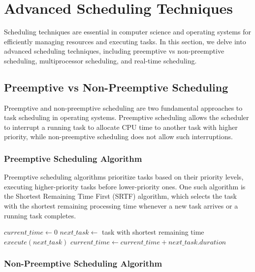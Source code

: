 \documentclass[12pt]{book} %
\begin{document}
\section{Advanced Scheduling Techniques}

Scheduling techniques are essential in computer science and operating systems for efficiently managing resources and executing tasks. In this section, we delve into advanced scheduling techniques, including preemptive vs non-preemptive scheduling, multiprocessor scheduling, and real-time scheduling.

\subsection{Preemptive vs Non-Preemptive Scheduling}

Preemptive and non-preemptive scheduling are two fundamental approaches to task scheduling in operating systems. Preemptive scheduling allows the scheduler to interrupt a running task to allocate CPU time to another task with higher priority, while non-preemptive scheduling does not allow such interruptions.

\subsubsection{Preemptive Scheduling Algorithm}

Preemptive scheduling algorithms prioritize tasks based on their priority levels, executing higher-priority tasks before lower-priority ones. One such algorithm is the Shortest Remaining Time First (SRTF) algorithm, which selects the task with the shortest remaining processing time whenever a new task arrives or a running task completes.
\FloatBarrier
\begin{algorithm}
\caption{Shortest Remaining Time First (SRTF)}
\begin{algorithmic}[1]
\State $current\_time \gets 0$
\State $next\_task \gets$ task with shortest remaining time
\State $execute(next\_task)$
\State $current\_time \gets current\_time + next\_task.duration$
\EndWhile
\EndProcedure
\end{algorithmic}
\end{algorithm}
\FloatBarrier
\subsubsection{Non-Preemptive Scheduling Algorithm}
\end{document}
